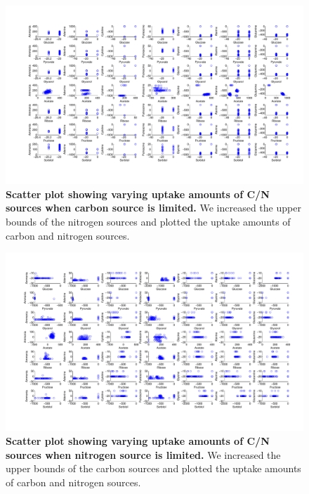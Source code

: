 \documentclass[12pt]{article}
\begin{document}
\setcounter{figure}{0}
\setcounter{table}{0}

\renewcommand{\figurename}{Supplementary Figure}

\clearpage
\begin{figure}[!ht]
\centerline{\includegraphics[width=9in]{Figures/SuppInfo/CarbonLimiting.pdf}}
\caption{\label{fig:CarbonLimiting}\textbf{Scatter plot showing varying uptake amounts of C/N sources when carbon source is limited.} We  increased the upper bounds of the nitrogen sources and plotted the uptake amounts of carbon and nitrogen sources.}
\end{figure}

\clearpage
\begin{figure}[!ht]
\centerline{\includegraphics[width=9in]{Figures/SuppInfo/NitrogenLimiting.pdf}}
\caption{\label{fig:NitrogenLimiting}\textbf{Scatter plot showing varying uptake amounts of C/N sources when nitrogen source is limited. }We  increased the upper bounds of the carbon sources and plotted the uptake amounts of carbon and nitrogen sources.}
\end{figure}
\end{document}
